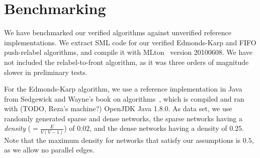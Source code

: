 \documentclass[smallcondensed]{svjour3}     %
\newcommand{\isai}{\lstinline[language=isabelle,basicstyle=\normalsize\ttfamily\slshape]}
\begin{document}
\begin{comment}
We use the previous results to complete the proof of the first step. It is easy
to see that \isai{init-preflow} and \isa{init-labeling} produce a valid preflow
as well as a valid height labeling function. We have also shown the maintanance
of these properties earlier. When the algorithm terminates, the excess value
$e(v)$ of each node $v \in V$ is equal to $0$. So, the preflow that was
maintained during the execution becomes a valid flow. Given the fact that the
height labeling assumptions are also maintained and using the latest auxillary
lemma, we can conclude that there is no path from source to sink in the residual
graph. Hence, the result of the algorithm is a maximum flow using the
Ford-fulkerson theorem.

\texttt{\\\\---Discuss termination proofs if required}

\texttt{\\\\---Discuss our time complexity proof, if required}

\texttt{\\\\---talk about relabel-to-front and fifo instances}

\end{comment}
  
\section{Benchmarking}\label{sec:benchmark}
  We have benchmarked our verified algorithms against unverified reference implementations.
  We extract SML code for our verified Edmonds-Karp and FIFO push-relabel algorithms, and compile it with MLton~\cite{MLton} version 20100608.
  We have not included the relabel-to-front algorithm, as it was three orders of magnitude slower in preliminary tests.
  
  For the Edmonds-Karp algorithm, we use a reference implementation in Java from Sedgewick and Wayne's book on algorithms~\cite{SeWa11}, which 
  is compiled and ran with (TODO, Reza's machine?) OpenJDK Java 1.8.0.
  As data set, we use randomly generated sparse and dense networks, the sparse networks having a \emph{density} (${} = \frac{E}{V(V - 1)}$) of $0.02$, and the dense networks having a density of $0.25$. Note that the maximum density for networks that satisfy our assumptions is $0.5$, as we allow no parallel edges.
  
\end{document}

